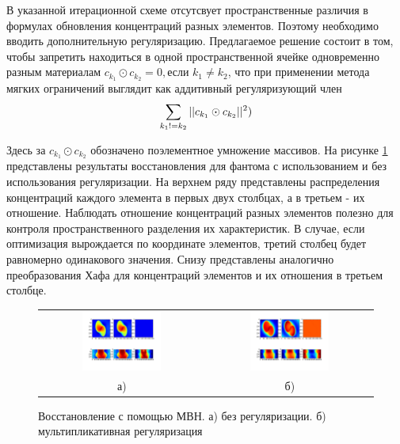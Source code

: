 В указанной итерационной схеме отсутсвует пространственные различия в формулах обновления концентраций разных элементов. 
Поэтому необходимо вводить дополнительную регуляризацию.
Предлагаемое решение состоит в том, чтобы запретить находиться в одной пространственной ячейке одновременно разным материалам $c_{k_1} \odot c_{k_2} = 0, \mbox{если } k_1 \neq k_2$, что при применении метода мягких ограничений выглядит как аддитивный регуляризующий член 
\begin{equation} \notag
	\sum_{k_1 != k_2} {||c_{k_1} \odot c_{k_2}||^2})
\end{equation}

Здесь за $c_{k_1} \odot c_{k_2}$ обозначено поэлементное умножение массивов.
На рисунке \ref{fig:whiteres} представлены результаты восстановления для фантома с использованием и без использования регуляризации.
На верхнем ряду представлены распределения концентраций каждого элемента в первых двух столбцах, а в третьем - их отношение.
Наблюдать отношение концентраций разных элементов полезно для контроля пространственного разделения их характеристик.
В случае, если оптимизация вырождается по координате элементов, третий столбец будет равномерно одинакового значения.
Снизу представлены аналогично преобразования Хафа для концентраций элементов и их отношения в третьем столбце.

\begin{figure}
\label{fig:whiteres}
\centering
\begin{tabular}{@{}c@{}c}
  \includegraphics[width=0.5\textwidth]{Dissertation/images/part3_img/no_reg_iteration_25} &
  \includegraphics[width=0.5\textwidth]{Dissertation/images/part3_img/mul_reg_iteration_150}
  \\
  а) &
  б) \\
\end{tabular}
\caption{Восстановление с помощью МВН. а) без регуляризации. б) мультипликативная регуляризация}
\vspace{5mm}
\end{figure}


